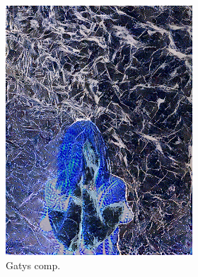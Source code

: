 \begin{figure}[]
\begin{subfigure}{\textwidth}
\begin{subfigure}{0.24\textwidth}
            \includegraphics[width=\textwidth]{images/04-experiment02/human/marble/gatys_im.jpg}
            \caption{Gatys comp.}
            \label{fig:ex02-human-marble-gatys_im}
        \end{subfigure}
        \hfill
        \begin{subfigure}{0.24\textwidth}
            \centering

\end{subfigure}
\end{subfigure}
\end{figure}
